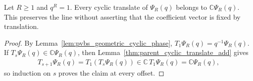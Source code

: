 \begin{lemma}
    \label{lem:pvbs_matching_volume_line_invariance}
    \leanok
    Let $R\ge1$ and $q^R=1$. Every cyclic translate of $\Psi_R(q)$ belongs
    to $\mathbb C\Psi_R(q)$. This preserves the line without asserting
    that the coefficient vector is fixed by translation.
\end{lemma}
\begin{proof}
    \leanok
    By Lemma~\ref{lem:pvbs_geometric_cyclic_phase},
    $T_1\Psi_R(q)=q^{-1}\Psi_R(q)$. If $T_s\Psi_R(q)\in\mathbb C\Psi_R(q)$,
    then Lemma~\ref{thm:parent_cyclic_translate_add} gives
    \begin{align}
        T_{s+1}\Psi_R(q)=T_1(T_s\Psi_R(q))\in\mathbb C\,T_1\Psi_R(q)
        =\mathbb C\Psi_R(q),
    \end{align}
    so induction on $s$ proves the claim at every offset.
\end{proof}

